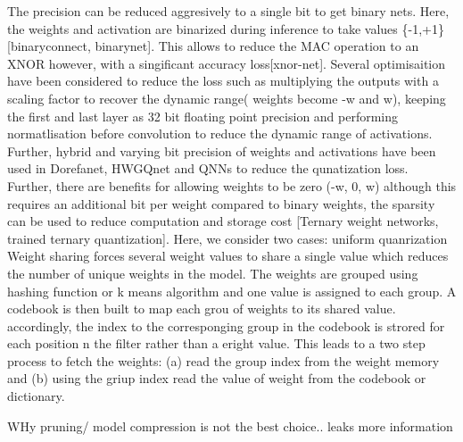 The precision can be reduced aggresively to a single bit to get binary nets. Here, the weights  and activation are binarized during inference to take values \{-1,+1\} [binaryconnect, binarynet]. This allows to reduce the MAC operation to an XNOR however, with a singificant accuracy loss[xnor-net].
Several optimisaition have been considered to reduce the loss such as multiplying the outputs with a scaling factor to recover the dynamic range( weights become -w and w), keeping the first and last layer as 32 bit floating point precision and performing normatlisation before convolution to reduce the dynamic range of activations.
Further, hybrid and varying bit precision of weights and activations have been used in Dorefanet, HWGQnet and QNNs to reduce the qunatization loss.
Further, there are benefits for allowing weights to be zero (-w, 0, w) although this requires an additional bit per weight compared to binary weights, the sparsity can be used to reduce computation and storage cost [Ternary weight networks, trained ternary quantization].
Here, we consider two cases: uniform quanrization
Weight sharing forces several weight values to share a single value which reduces the number of unique weights in the model.
The weights are grouped using hashing function or k means algorithm and one value is assigned to each group.
A codebook is then built to map each grou of weights to its shared value. accordingly, the index to the corresponging group in the codebook is strored for each position n the filter rather than a eright value. This leads to a two step process to fetch the weights:
(a) read the group index from the weight memory and (b) using the griup index read the value of weight from the codebook or dictionary.



WHy pruning/ model compression is not the best choice.. leaks more information




